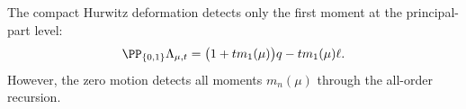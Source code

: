 \item The compact Hurwitz deformation detects only the first moment at the principal-part level:
\[
   \PP_{\{0,1\}}\Lambda_{\mu,t}
   =\bigl(1+tm_1(\mu)\bigr)q-tm_1(\mu)\ell.
\]
However, the zero motion detects all moments \(m_n(\mu)\) through the all-order recursion.
